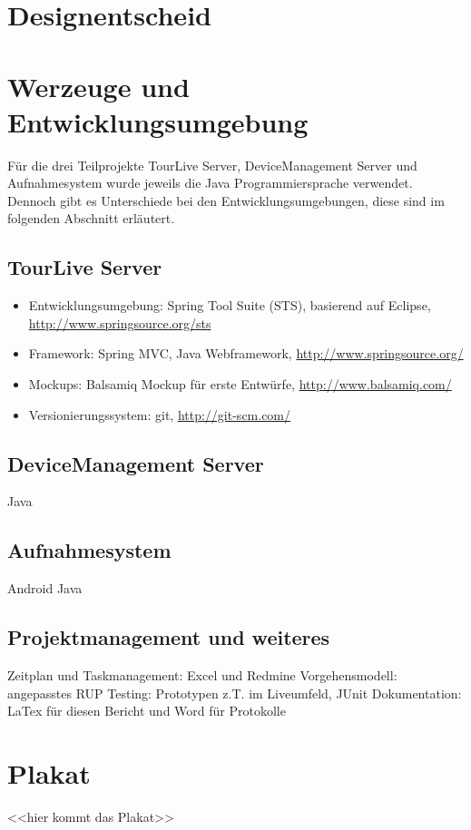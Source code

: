 \section{Designentscheid}


\section{Werzeuge und Entwicklungsumgebung}
Für die drei Teilprojekte TourLive Server, DeviceManagement Server und Aufnahmesystem wurde jeweils die Java Programmiersprache verwendet. Dennoch gibt es Unterschiede bei den Entwicklungsumgebungen, diese sind im folgenden Abschnitt erläutert.
\subsection{TourLive Server}
\begin{itemize}
\item Entwicklungsumgebung: Spring Tool Suite (STS), basierend auf Eclipse, \url{http://www.springsource.org/sts}
\item Framework: Spring MVC, Java Webframework, \url{http://www.springsource.org/}
\item Mockups: Balsamiq Mockup für erste Entwürfe, \url{http://www.balsamiq.com/}
\item Versionierungssystem: git, \url{http://git-scm.com/}
\end{itemize}

\subsection{DeviceManagement Server}
Java

\subsection{Aufnahmesystem}
Android Java

\subsection{Projektmanagement und weiteres}
Zeitplan und Taskmanagement: Excel und Redmine
Vorgehensmodell: angepasstes RUP
Testing: Prototypen z.T. im Liveumfeld, JUnit
Dokumentation: LaTex für diesen Bericht und Word für Protokolle

\section{Plakat}
<<hier kommt das Plakat>>

